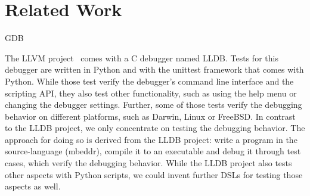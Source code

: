 \section{Related Work}

\ac{GDB}

The \ac{LLVM} project~\cite{LLDB} comes with a C debugger named \ac{LLDB}.
Tests for this debugger are written in Python and with the 
unittest framework that comes with Python.
While those test verify the debugger's command
line interface and the scripting API, they also test other functionality, such
as using the help menu or changing the debugger settings.
Further, some of those tests
verify the debugging behavior on different platforms, such as Darwin, Linux or
FreeBSD.
In contrast to the \ac{LLDB} project, we only concentrate on testing
the debugging behavior. The approach for doing so is derived from the \ac{LLDB} 
project:
write a program in the source-language (mbeddr), compile it to an executable and
debug it through test cases, which verify the debugging behavior. While the 
\ac{LLDB} project also tests other aspects with Python scripts, we could invent
further \acp{DSL} for testing those aspects as well.
